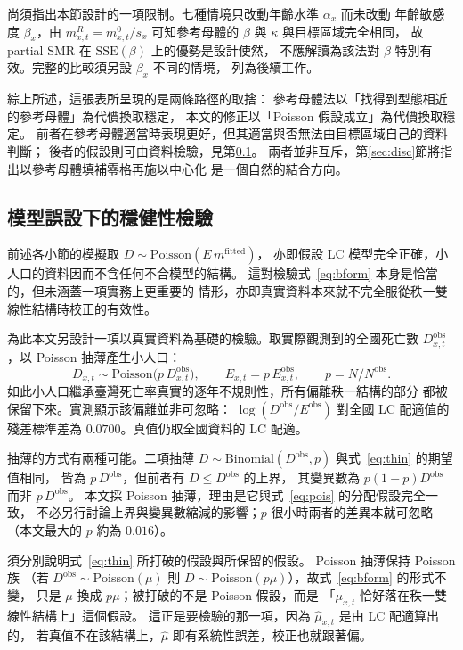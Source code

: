 \documentclass[UTF8, fontset=macnew, a4paper, 12pt]{ctexart}
\begin{document}
尚須指出本節設計的一項限制。七種情境只改動年齡水準 $\alpha_x$ 而未改動
年齡敏感度 $\beta_x$，由 $m^{R}_{x,t}=m^{0}_{x,t}/s_x$ 可知參考母體的
$\beta$ 與 $\kappa$ 與目標區域完全相同，
故 partial SMR 在 $\mathrm{SSE}(\beta)$ 上的優勢是設計使然，
不應解讀為該法對 $\beta$ 特別有效。完整的比較須另設 $\beta_x$ 不同的情境，
列為後續工作。

綜上所述，這張表所呈現的是兩條路徑的取捨：
參考母體法以「找得到型態相近的參考母體」為代價換取穩定，
本文的修正以「Poisson 假設成立」為代價換取穩定。
前者在參考母體適當時表現更好，但其適當與否無法由目標區域自己的資料判斷；
後者的假設則可由資料檢驗，見第\ref{sec:real}。
兩者並非互斥，第\ref{sec:disc}節將指出以參考母體填補零格再施以中心化
是一個自然的結合方向。

\subsection{模型誤設下的穩健性檢驗}\label{sec:real}

前述各小節的模擬取 $D\sim\text{Poisson}(E\,m^{\text{fitted}})$，
亦即假設 LC 模型完全正確，小人口的資料因而不含任何不合模型的結構。
這對檢驗式~\eqref{eq:bform} 本身是恰當的，但未涵蓋一項實務上更重要的
情形，亦即真實資料本來就不完全服從秩一雙線性結構時校正的有效性。

為此本文另設計一項以真實資料為基礎的檢驗。取實際觀測到的全國死亡數
$D^{\text{obs}}_{x,t}$，以 Poisson 抽薄產生小人口：
\begin{equation}\label{eq:thin}
D_{x,t}\sim\text{Poisson}\big(p\,D^{\text{obs}}_{x,t}\big),\qquad
E_{x,t}=p\,E^{\text{obs}}_{x,t},\qquad p=N/N^{\text{obs}} .
\end{equation}
如此小人口繼承臺灣死亡率真實的逐年不規則性，所有偏離秩一結構的部分
都被保留下來。實測顯示該偏離並非可忽略：
$\log(D^{\text{obs}}/E^{\text{obs}})$ 對全國 LC 配適值的殘差標準差為
$0.0700$。真值仍取全國資料的 LC 配適。

抽薄的方式有兩種可能。二項抽薄
$D\sim\text{Binomial}(D^{\text{obs}},p)$ 與式~\eqref{eq:thin} 的期望值相同，
皆為 $p\,D^{\text{obs}}$，但前者有 $D\le D^{\text{obs}}$ 的上界，
其變異數為 $p(1-p)D^{\text{obs}}$ 而非 $p\,D^{\text{obs}}$。
本文採 Poisson 抽薄，理由是它與式~\eqref{eq:pois} 的分配假設完全一致，
不必另行討論上界與變異數縮減的影響；$p$ 很小時兩者的差異本就可忽略
（本文最大的 $p$ 約為 $0.016$）。

須分別說明式~\eqref{eq:thin} 所打破的假設與所保留的假設。 Poisson 抽薄保持 Poisson 族
（若 $D^{\text{obs}}\sim\text{Poisson}(\mu)$ 則
$D\sim\text{Poisson}(p\mu)$），故式~\eqref{eq:bform} 的形式不變，
只是 $\mu$ 換成 $p\mu$；被打破的不是 Poisson 假設，而是
「$\mu_{x,t}$ 恰好落在秩一雙線性結構上」這個假設。
這正是要檢驗的那一項，因為 $\hat\mu_{x,t}$ 是由 LC 配適算出的，
若真值不在該結構上，$\hat\mu$ 即有系統性誤差，校正也就跟著偏。
\end{document}
